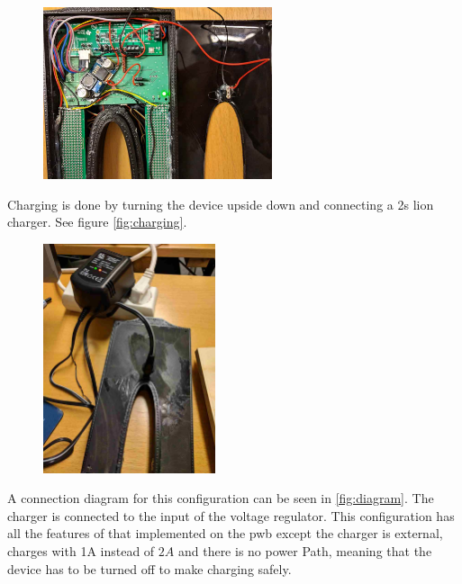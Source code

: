 \begin{figure}[H]
	\centering
	\includegraphics[width=0.6\textwidth]{Figures/modules.jpg}
	\label{fig:modules}
\end{figure}


Charging is done by turning the device upside down and connecting a \gls{2s} \gls{lion} charger. See figure \autoref{fig:charging}.

\begin{figure}[H]
	\centering
	\includegraphics[width=0.45\textwidth]{Figures/charging.jpg}
	\label{fig:charging}
\end{figure}

A connection diagram for this configuration can be seen in \autoref{fig:diagram}. The charger is connected to the input of the voltage regulator. This configuration has all the features of that implemented on the \gls{pwb} except the charger is external, charges with 1A instead of $2A$ and there is no power Path, meaning that the device has to be turned off to make charging safely.

